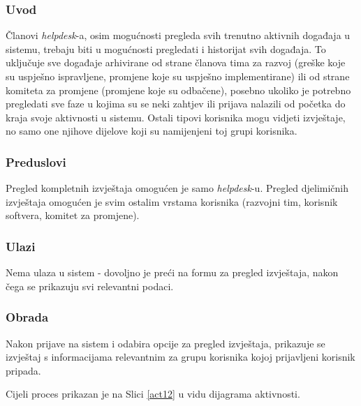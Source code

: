 \documentclass[12pt,a4paper]{article}
\begin{document}
\subsubsection{Uvod}

Članovi \textit{helpdesk}-a, osim mogućnosti pregleda svih trenutno aktivnih događaja u sistemu, trebaju biti u mogućnosti pregledati i historijat svih događaja. To uključuje sve događaje arhivirane od strane članova tima za razvoj (greške koje su uspješno ispravljene, promjene koje su uspješno implementirane) ili od strane komiteta za promjene (promjene koje su odbačene), posebno ukoliko je potrebno pregledati sve faze u kojima su se neki zahtjev ili prijava nalazili od početka do kraja svoje aktivnosti u sistemu. Ostali tipovi korisnika mogu vidjeti izvještaje, no  samo one njihove dijelove koji su namijenjeni toj grupi korisnika.

\subsubsection{Preduslovi}

Pregled kompletnih izvještaja omogućen je samo \textit{helpdesk}-u. Pregled djelimičnih izvještaja omogućen je svim ostalim vrstama korisnika (razvojni tim, korisnik softvera, komitet za promjene).

\subsubsection{Ulazi}

Nema ulaza u sistem - dovoljno je preći na formu za pregled izvještaja, nakon čega se prikazuju svi relevantni podaci.

\subsubsection{Obrada}

Nakon prijave na sistem i odabira opcije za pregled izvještaja, prikazuje se izvještaj s informacijama relevantnim za grupu korisnika kojoj prijavljeni korisnik pripada.

Cijeli proces prikazan je na Slici \ref{act12} u vidu dijagrama aktivnosti.
\end{document}
